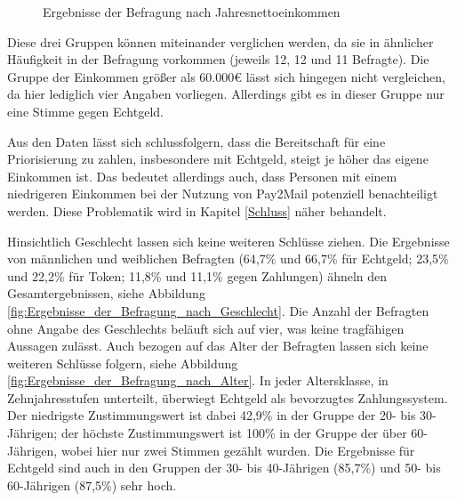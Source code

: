 \begin{figure}[!h]
\centering
\caption[Ergebnisse der Befragung nach Jahresnettoeinkommen]{Ergebnisse der Befragung nach Jahresnettoeinkommen}
\label{fig:Auswahl_des_Zahlungssystems_der_Befragten_nach_Jahresnettoeinkommen}
\end{figure}

Diese drei Gruppen können miteinander verglichen werden, da sie in ähnlicher Häufigkeit in der Befragung vorkommen (jeweils 12, 12 und 11 Befragte). Die Gruppe der Einkommen größer als 60.000€ lässt sich hingegen nicht vergleichen, da hier lediglich vier Angaben vorliegen. Allerdings gibt es in dieser Gruppe nur eine Stimme gegen Echtgeld.

Aus den Daten lässt sich schlussfolgern, dass die Bereitschaft für eine Priorisierung zu zahlen, insbesondere mit Echtgeld, steigt je höher das eigene Einkommen ist. Das bedeutet allerdings auch, dass Personen mit einem niedrigeren Einkommen bei der Nutzung von Pay2Mail potenziell benachteiligt werden. Diese Problematik wird in Kapitel \ref{Schluss} näher behandelt. 

Hinsichtlich Geschlecht lassen sich keine weiteren Schlüsse ziehen. Die Ergebnisse von männlichen und weiblichen Befragten (64,7\% und 66,7\% für Echtgeld; 23,5\% und 22,2\% für Token; 11,8\% und 11,1\% gegen Zahlungen) ähneln den Gesamtergebnissen, siehe Abbildung \ref{fig:Ergebnisse_der_Befragung_nach_Geschlecht}. Die Anzahl der Befragten ohne Angabe des Geschlechts beläuft sich auf vier, was keine tragfähigen Aussagen zulässt. Auch bezogen auf das Alter der Befragten lassen sich keine weiteren Schlüsse folgern, siehe Abbildung \ref{fig:Ergebnisse_der_Befragung_nach_Alter}. In jeder Altersklasse, in Zehnjahresstufen unterteilt, überwiegt Echtgeld als bevorzugtes Zahlungssystem. Der niedrigste Zustimmungswert ist dabei 42,9\% in der Gruppe der 20- bis 30-Jährigen; der höchste Zustimmungswert ist 100\% in der Gruppe der über 60-Jährigen, wobei hier nur zwei Stimmen gezählt wurden. Die Ergebnisse für Echtgeld sind auch in den Gruppen der 30- bis 40-Jährigen (85,7\%) und 50- bis 60-Jährigen (87,5\%) sehr hoch.

